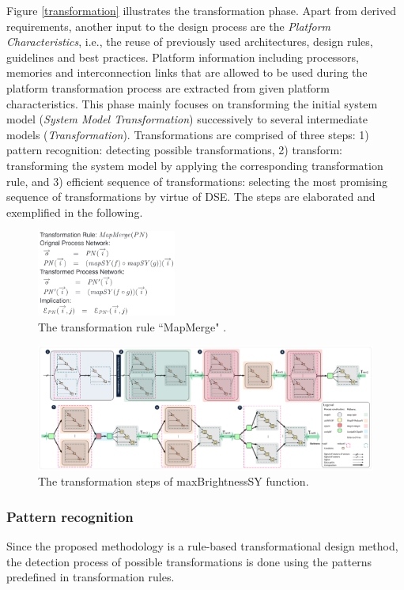 Figure \ref{transformation} illustrates the transformation phase. Apart from derived requirements, another input to the design process are the \textit{Platform Characteristics}, i.e., the reuse of previously used architectures, design rules, guidelines and best practices.
Platform information including processors, memories and interconnection links that are allowed to be used during the platform transformation process are extracted from given platform characteristics. 
This phase mainly focuses on transforming the initial system model (\textit{System Model Transformation}) successively to several intermediate models (\textit{Transformation}).
Transformations are comprised of three steps: 1) pattern recognition: detecting possible transformations, 2) transform: transforming the system model by applying the corresponding transformation rule, and 3) efficient sequence  of  transformations: selecting the most promising sequence  of  transformations by virtue of DSE. The steps are elaborated and exemplified in the following. 

\begin{figure}[t]
	\centering
	\includegraphics[width=1.8in]{figs-src/MapMerge.png}
	\caption{The transformation rule ``MapMerge" \cite{sander2003system}.}
	\label{MapMerge}
\end{figure}
\begin{figure}[t]
	\centering
	\includegraphics[width=\linewidth]{figs-src/brightness-transformation-flat.pdf}
	\caption{The transformation steps of maxBrightnessSY function.}
	\label{pattern}
\end{figure}

\subsubsection{Pattern recognition}  
Since the proposed methodology is a rule-based transformational design method, the detection process of possible transformations is done using the patterns predefined in transformation rules. 


